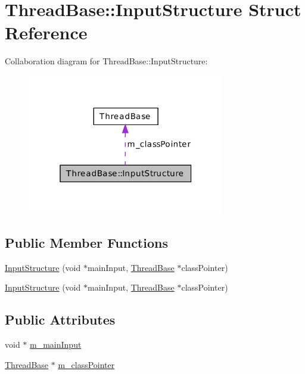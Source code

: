 \hypertarget{struct_thread_base_1_1_input_structure}{\section{Thread\-Base\-:\-:Input\-Structure Struct Reference}
\label{struct_thread_base_1_1_input_structure}
}


Collaboration diagram for Thread\-Base\-:\-:Input\-Structure\-:\nopagebreak
\begin{figure}[H]
\begin{center}
\leavevmode
\includegraphics[width=244pt]{struct_thread_base_1_1_input_structure__coll__graph}
\end{center}
\end{figure}
\subsection*{Public Member Functions}
\begin{DoxyCompactItemize}
\item 
\hyperlink{struct_thread_base_1_1_input_structure_a05703c0e565f0d0616e5439d4bcbd2f7}{Input\-Structure} (void $\ast$main\-Input, \hyperlink{class_thread_base}{Thread\-Base} $\ast$class\-Pointer)
\item 
\hyperlink{struct_thread_base_1_1_input_structure_a05703c0e565f0d0616e5439d4bcbd2f7}{Input\-Structure} (void $\ast$main\-Input, \hyperlink{class_thread_base}{Thread\-Base} $\ast$class\-Pointer)
\end{DoxyCompactItemize}
\subsection*{Public Attributes}
\begin{DoxyCompactItemize}
\item 
void $\ast$ \hyperlink{struct_thread_base_1_1_input_structure_ab91961eacdcce8b1628f46a1a116fa1e}{m\-\_\-main\-Input}
\item 
\hyperlink{class_thread_base}{Thread\-Base} $\ast$ \hyperlink{struct_thread_base_1_1_input_structure_af522f05c6feb189c62b450a7eb344986}{m\-\_\-class\-Pointer}
\end{DoxyCompactItemize}


